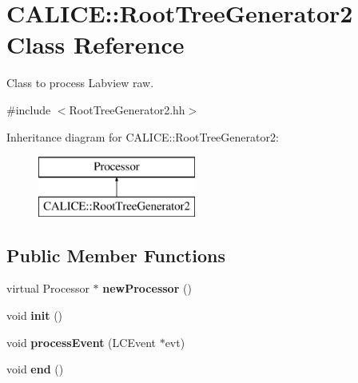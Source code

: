 \section{C\-A\-L\-I\-C\-E\-:\-:Root\-Tree\-Generator2 Class Reference}
\label{classCALICE_1_1RootTreeGenerator2}


Class to process Labview raw.  




{\ttfamily \#include $<$Root\-Tree\-Generator2.\-hh$>$}

Inheritance diagram for C\-A\-L\-I\-C\-E\-:\-:Root\-Tree\-Generator2\-:\begin{figure}[H]
\begin{center}
\leavevmode
\includegraphics[height=2.000000cm]{classCALICE_1_1RootTreeGenerator2}
\end{center}
\end{figure}
\subsection*{Public Member Functions}
\begin{DoxyCompactItemize}
\item 
virtual Processor $\ast$ {\bfseries new\-Processor} ()\label{classCALICE_1_1RootTreeGenerator2_ab4853d325591a5a66bcb9ebc16cbb136}

\item 
void {\bfseries init} ()\label{classCALICE_1_1RootTreeGenerator2_a80c7d615ad996292e02080c89a7da898}

\item 
void {\bfseries process\-Event} (L\-C\-Event $\ast$evt)\label{classCALICE_1_1RootTreeGenerator2_aca785fa947fe4759fddb0d3dfc417aaa}

\item 
void {\bfseries end} ()\label{classCALICE_1_1RootTreeGenerator2_ad8313adc1a956f6c5b5d24c6174e8c7c}

\end{DoxyCompactItemize}
